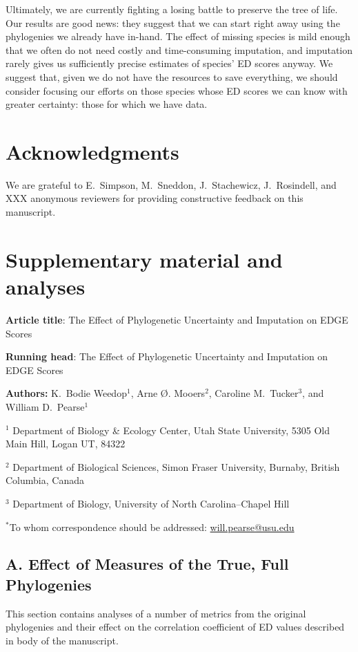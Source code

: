 \documentclass[10pt,english]{article}
\begin{document}
Ultimately, we are currently fighting a losing battle to preserve the tree of
life. Our results are good news: they suggest that we can start right away using
the phylogenies we already have in-hand. The effect of missing species is mild
enough that we often do not need costly and time-consuming imputation, and
imputation rarely gives us sufficiently precise estimates of species' ED scores
anyway. We suggest that, given we do not have the resources to save everything,
we should consider focusing our efforts on those species whose ED scores we can
know with greater certainty: those for which we have data.

\section*{Acknowledgments}
We are grateful to E.\ Simpson, M.\ Sneddon, J.\ Stachewicz, J.\ Rosindell, and XXX
anonymous reviewers for providing constructive feedback on this
manuscript.

\clearpage
\printbibliography

\clearpage
\appendix 
\section*{Supplementary material and analyses}
\textbf{Article title}: The Effect of Phylogenetic Uncertainty and Imputation on EDGE Scores

\textbf{Running head}: The Effect of Phylogenetic Uncertainty and Imputation on EDGE Scores

\textbf{Authors:} K.\ Bodie Weedop$^{1}$, Arne \O. Mooers$^2$, Caroline M.\ Tucker$^3$, and William D.\ Pearse$^{1}$\

$^1$ Department of Biology \& Ecology Center, Utah State University,
5305 Old Main Hill, Logan UT, 84322

$^2$ Department of Biological Sciences, Simon Fraser University, Burnaby,
British Columbia, Canada

$^3$ Department of Biology, University of North Carolina–Chapel Hill

$^*$To whom correspondence should be addressed:
\url{will.pearse@usu.edu}
\clearpage
\subsection*{A. Effect of Measures of the True, Full Phylogenies}

This section contains analyses of a number of metrics from the original
phylogenies and their effect on the correlation coefficient of ED values
described in body of the manuscript.
\end{document}
